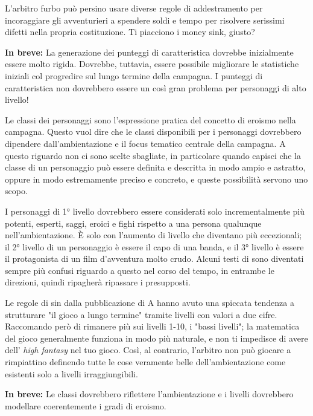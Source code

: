 L'arbitro furbo può persino usare diverse regole di addestramento per incoraggiare gli avventurieri a spendere soldi e tempo per risolvere serissimi difetti nella propria costituzione. Ti piacciono i money sink, giusto?

\textbf{In breve:} La generazione dei punteggi di caratteristica dovrebbe inizialmente essere molto rigida. Dovrebbe, tuttavia, essere possibile migliorare le statistiche iniziali col progredire sul lungo termine della campagna. I punteggi di caratteristica non dovrebbero essere un così gran problema per personaggi di alto livello!


Le classi dei personaggi sono l'espressione pratica del concetto di eroismo nella campagna. Questo vuol dire che le classi disponibili per i personaggi dovrebbero dipendere dall'ambientazione e il focus tematico centrale della campagna. A questo riguardo non ci sono scelte sbagliate, in particolare quando capisci che la classe di un personaggio può essere definita e descritta in modo ampio e astratto, oppure in modo estremamente preciso e concreto, e queste possibilità servono uno scopo.

I personaggi di 1° livello dovrebbero essere considerati solo incrementalmente più potenti, esperti, saggi, eroici e fighi rispetto a una persona qualunque nell'ambientazione. È solo con l'aumento di livello che diventano più eccezionali; il 2° livello di un personaggio è essere il capo di una banda, e il 3° livello è essere il protagonista di un film d'avventura molto crudo. Alcuni testi di \dnd{} sono diventati sempre più confusi riguardo a questo nel corso del tempo, in entrambe le direzioni, quindi ripagherà ripassare i presupposti.

Le regole di \dnd{} sin dalla pubblicazione di A\dnd{} hanno avuto una spiccata tendenza a strutturare "il gioco a lungo termine" tramite livelli con valori a due cifre. Raccomando però di rimanere più sui livelli 1-10, i "bassi livelli"; la matematica del gioco generalmente funziona in modo più naturale, e non ti impedisce di avere dell' \textit{high fantasy} nel tuo gioco. Così, al contrario, l'arbitro non può giocare a rimpiattino definendo tutte le cose veramente belle dell'ambientazione come esistenti solo a livelli irraggiungibili.

\textbf{In breve:} Le classi dovrebbero riflettere l'ambientazione e i livelli dovrebbero modellare coerentemente i gradi di eroismo.


